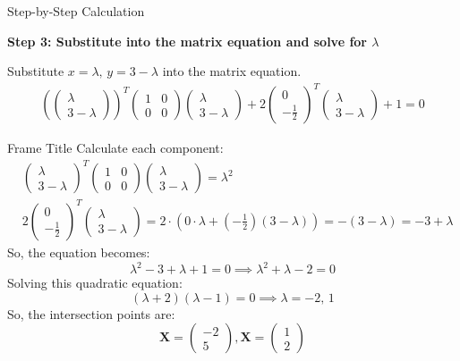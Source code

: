 \documentclass{beamer}
\let\vec\mathbf
\theoremstyle{remark}
\newcommand{\myvec}[1]{\ensuremath{\begin{pmatrix}#1\end{pmatrix}}}
\numberwithin{equation}{section}
\begin{document}
     \begin{frame}{ Step-by-Step Calculation}    

\textbf{Step 3: Substitute into the matrix equation and solve for \(\lambda\)}

Substitute \( x = \lambda,\, y = 3 - \lambda \) into the matrix equation.
\begin{align*}
\left(
\begin{pmatrix}
\lambda \\
3 - \lambda
\end{pmatrix}
\right)^T 
\begin{pmatrix}
1 & 0 \\
0 & 0
\end{pmatrix}
\begin{pmatrix}
\lambda \\
3 - \lambda
\end{pmatrix}
+ 2
\begin{pmatrix}
0 \\
-\frac{1}{2}
\end{pmatrix}^T 
\begin{pmatrix}
\lambda \\
3 - \lambda
\end{pmatrix}
+ 1 = 0
\end{align*}
\end{frame}
\begin{frame}{Frame Title}
    Calculate each component:
\begin{align*}
& \begin{pmatrix}
\lambda \\
3 - \lambda
\end{pmatrix}^T 
\begin{pmatrix}
1 & 0 \\
0 & 0
\end{pmatrix}
\begin{pmatrix}
\lambda \\
3 - \lambda
\end{pmatrix}
= \lambda^2 \\
& 2\begin{pmatrix}
0 \\
-\frac{1}{2}
\end{pmatrix}^T 
\begin{pmatrix}
\lambda \\
3 - \lambda
\end{pmatrix}
= 2 \cdot \left(0 \cdot \lambda + \left(-\frac{1}{2}\right) (3 - \lambda) \right)
= - (3 - \lambda) = -3 + \lambda
\end{align*}
So, the equation becomes:
\[
\lambda^2 - 3 + \lambda + 1 = 0 
\implies \lambda^2 + \lambda - 2 = 0
\]
Solving this quadratic equation:
\[
(\lambda + 2)(\lambda - 1) = 0 \implies \lambda = -2,\, 1
\]
So, the intersection points are:
\[
\vec{X} = \myvec{-2\\ 5} , \vec{X} = \myvec{1\\2}
\]


\end{frame}
\end{document}
